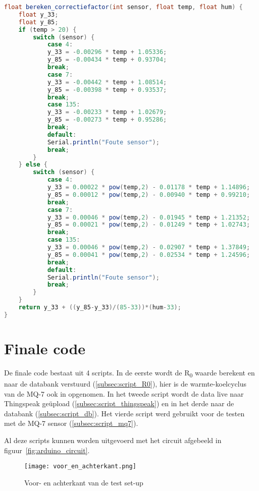 \begin{lstlisting}[language=Java,caption={Berekenen van de correctiefactor}]
float bereken_correctiefactor(int sensor, float temp, float hum) {
    float y_33;
    float y_85;
    if (temp > 20) {
        switch (sensor) {
            case 4:
            y_33 = -0.00296 * temp + 1.05336;
            y_85 = -0.00434 * temp + 0.93704;
            break;
            case 7:
            y_33 = -0.00442 * temp + 1.08514;
            y_85 = -0.00398 * temp + 0.93537;
            break;
            case 135:
            y_33 = -0.00233 * temp + 1.02679;
            y_85 = -0.00273 * temp + 0.95286;
            break;
            default:
            Serial.println("Foute sensor");
            break;
        }
    } else {
        switch (sensor) {
            case 4:
            y_33 = 0.00022 * pow(temp,2) - 0.01178 * temp + 1.14896;
            y_85 = 0.00012 * pow(temp,2) - 0.00940 * temp + 0.99210;
            break;
            case 7:
            y_33 = 0.00046 * pow(temp,2) - 0.01945 * temp + 1.21352;
            y_85 = 0.00021 * pow(temp,2) - 0.01249 * temp + 1.02743;
            break;
            case 135:
            y_33 = 0.00046 * pow(temp,2) - 0.02907 * temp + 1.37849;
            y_85 = 0.00041 * pow(temp,2) - 0.02534 * temp + 1.24596;
            break;
            default:
            Serial.println("Foute sensor");
            break;
        }
    }
    return y_33 + ((y_85-y_33)/(85-33))*(hum-33);
}
\end{lstlisting}


\section{Finale code}%
\label{sec:final}

De finale code bestaat uit 4 scripts. In de eerste wordt de R\textsubscript{0} waarde berekent en naar de databank verstuurd (\ref{subsec:script_R0}), hier is de warmte-koelcyclus van de MQ-7 ook in opgenomen. In het tweede script wordt de data live naar Thingspeak geüpload (\ref{subsec:script_thingspeak}) en in het derde naar de databank (\ref{subsec:script_db}). Het vierde script werd gebruikt voor de testen met de MQ-7 sensor (\ref{subsec:script_mq7}).

Al deze scripts kunnen worden uitgevoerd met het circuit afgebeeld in figuur~\ref{fig:arduino_circuit}.


\begin{figure}[h]
    \texttt{[image: voor\_en\_achterkant.png]}
    \caption[Foto test set-up]{Voor- en achterkant van de test set-up}
    \label{fig:voor_en_achterkant}
\end{figure}

